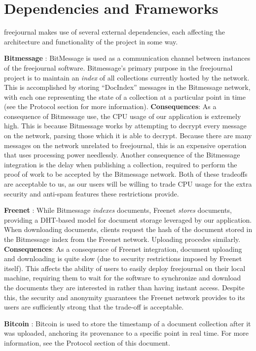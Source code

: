 \documentclass[letterpaper,10pt,oneside]{sphinxmanual}
\begin{document}
\section{Dependencies and Frameworks}
\label{architecture:dependencies-and-frameworks}
freejournal makes use of several external dependencies, each affecting the
architecture and functionality of the project in some way.

\textbf{Bitmessage} : BitMessage is used as a communication channel between instances of the freejournal software.  Bitmessage's primary
purpose in the freejournal project is to maintain an \emph{index} of all collections currently hosted by the network.  This is
accomplished by storing ``DocIndex'' messages in the Bitmessage network, with each one representing the state of a collection at a
particular point in time (see the Protocol section for more information).  \textbf{Consequences}: As a consequence of Bitmessage use,
the CPU usage of our application is extremely high.  This is because Bitmessage works by attempting to decrypt every message
on the network, parsing those which it is able to decrypt.  Because there are many messages on the network unrelated to freejournal,
this is an expensive operation that uses processing power needlessly.  Another consequence of the Bitmessage integration is the delay
when publishing a collection, required to perform the proof of work to be accepted by the Bitmessage network.  Both of these tradeoffs
are acceptable to us, as our users will be willing to trade CPU usage for the extra security and anti-spam features these restrictions
provide.

\textbf{Freenet} : While Bitmessage \emph{indexes} documents, Freenet \emph{stores} documents, providing a DHT-based model for document storage
leveraged by our application.  When downloading documents, clients request the hash of the document stored in the Bitmessage index
from the Freenet network.  Uploading procedes similarly.  \textbf{Consequences}: As a consequence of Freenet integration, document
uploading and downloading is quite slow (due to security restrictions imposed by Freenet itself).  This affects the ability of users
to easily deploy freejournal on their local machine, requiring them to wait for the software to synchronize and download the documents
they are interested in rather than having instant access.  Despite this, the security and anonymity guarantees the Freenet network
provides to its users are sufficiently strong that the trade-off is acceptable.

\textbf{Bitcoin} : Bitcoin is used to store the timestamp of a document collection after it was uploaded, anchoring its provenance to
a specific point in real time.  For more information, see the Protocol section of this document.
\end{document}
